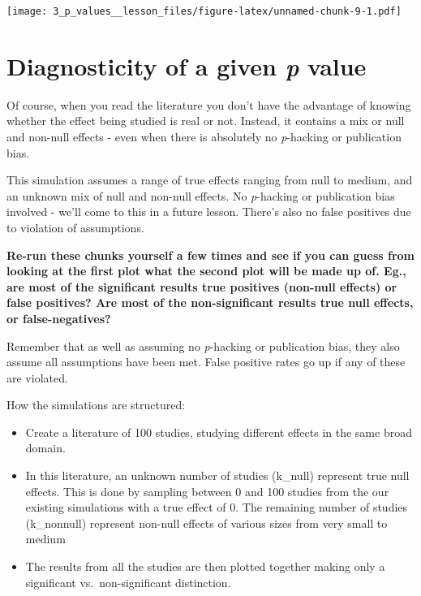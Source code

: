 \documentclass[
]{article}
\providecommand{\tightlist}{%
  \setlength{\itemsep}{0pt}\setlength{\parskip}{0pt}}
\begin{document}
\texttt{[image: 3\_p\_values\_\_lesson\_files/figure-latex/unnamed-chunk-9-1.pdf]}

\hypertarget{diagnosticity-of-a-given-p-value}{%
\section{\texorpdfstring{Diagnosticity of a given \emph{p}
value}{Diagnosticity of a given p value}}\label{diagnosticity-of-a-given-p-value}}

Of course, when you read the literature you don't have the advantage of
knowing whether the effect being studied is real or not. Instead, it
contains a mix or null and non-null effects - even when there is
absolutely no \emph{p}-hacking or publication bias.

This simulation assumes a range of true effects ranging from null to
medium, and an unknown mix of null and non-null effects. No
\emph{p}-hacking or publication bias involved - we'll come to this in a
future lesson. There's also no false positives due to violation of
assumptions.

\textbf{Re-run these chunks yourself a few times and see if you can
guess from looking at the first plot what the second plot will be made
up of. Eg., are most of the significant results true positives (non-null
effects) or false positives? Are most of the non-significant results
true null effects, or false-negatives?}

Remember that as well as assuming no \emph{p}-hacking or publication
bias, they also assume all assumptions have been met. False positive
rates go up if any of these are violated.

How the simulations are structured:

\begin{itemize}
\tightlist
\item
  Create a literature of 100 studies, studying different effects in the
  same broad domain.
\item
  In this literature, an unknown number of studies (k\_null) represent
  true null effects. This is done by sampling between 0 and 100 studies
  from the our existing simulations with a true effect of 0. The
  remaining number of studies (k\_nonnull) represent non-null effects of
  various sizes from very small to medium
\item
  The results from all the studies are then plotted together making only
  a significant vs.~non-significant distinction.
\end{itemize}
\end{document}
